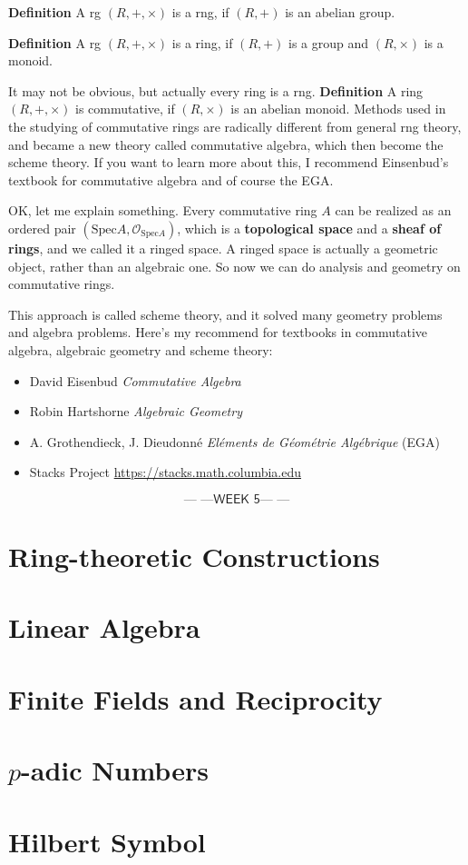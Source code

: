 \documentclass{report}
\newcommand{\week}[1]{$$\textsf{--- ---WEEK #1--- ---}$$}
\begin{document}
\textbf{Definition} A rg $(R,+,\times)$ is a rng, if $(R,+)$ is an abelian group.

\textbf{Definition} A rg $(R,+,\times)$ is a ring, if $(R,+)$ is a group and $(R,\times)$ is a monoid.

It may not be obvious, but actually every ring is a rng.
\newline
\newline
\textbf{Definition} A ring $(R,+,\times)$ is commutative, if $(R,\times)$ is an abelian monoid.
\newline
\newline
Methods used in the studying of commutative rings are radically different from general rng theory, and became a new theory called commutative algebra, which then become the scheme theory. If you want to learn more about this, I recommend Einsenbud's textbook for commutative algebra and of course the EGA.

OK, let me explain something. Every commutative ring $A$ can be realized as an ordered pair $(\text{Spec}A, \mathcal{O}_{\text{Spec}A})$, which is a \textbf{topological space} and a \textbf{sheaf of rings}, and we called it a ringed space. A ringed space is actually a geometric object, rather than an algebraic one. So now we can do analysis and geometry on commutative rings.

This approach is called scheme theory, and it solved many geometry problems and algebra problems. Here's my recommend for textbooks in commutative algebra, algebraic geometry and scheme theory:
\begin{itemize}
\item David Eisenbud \textit{Commutative Algebra}
\item Robin Hartshorne \textit{Algebraic Geometry}
\item A. Grothendieck, J. Dieudonn\'e \textit{El\'ements de G\'eom\'etrie Alg\'ebrique} (EGA)
\item Stacks Project \url{https://stacks.math.columbia.edu}
\end{itemize}
\newpage
\week{5}
\chapter{Ring-theoretic Constructions}
\chapter{Linear Algebra}
\chapter{Finite Fields and Reciprocity}
\chapter{$p$-adic Numbers}
\chapter{Hilbert Symbol}
\end{document}
